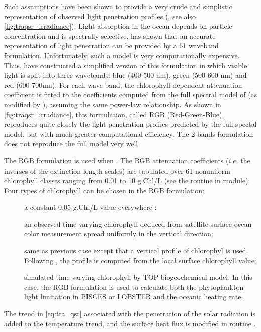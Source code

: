 \documentclass[../main/NEMO_manual]{subfiles}
\begin{document}
Such assumptions have been shown to provide a very crude and simplistic representation of
observed light penetration profiles (\cite{Morel_JGR88}, see also \autoref{fig:traqsr_irradiance}).
Light absorption in the ocean depends on particle concentration and is spectrally selective.
\cite{Morel_JGR88} has shown that an accurate representation of light penetration can be provided by
a 61 waveband formulation.
Unfortunately, such a model is very computationally expensive.
Thus, \cite{Lengaigne_al_CD07} have constructed a simplified version of this formulation in which
visible light is split into three wavebands: blue (400-500 nm), green (500-600 nm) and red (600-700nm).
For each wave-band, the chlorophyll-dependent attenuation coefficient is fitted to the coefficients computed from
the full spectral model of \cite{Morel_JGR88} (as modified by \cite{Morel_Maritorena_JGR01}),
assuming the same power-law relationship.
As shown in \autoref{fig:traqsr_irradiance}, this formulation, called RGB (Red-Green-Blue),
reproduces quite closely the light penetration profiles predicted by the full spectal model,
but with much greater computational efficiency.
The 2-bands formulation does not reproduce the full model very well. 

The RGB formulation is used when .
The RGB attenuation coefficients ($i.e.$ the inverses of the extinction length scales) are tabulated over
61 nonuniform chlorophyll classes ranging from 0.01 to 10 g.Chl/L
(see the routine  in  module).
Four types of chlorophyll can be chosen in the RGB formulation:
\begin{description} 
\item[]
  a constant 0.05 g.Chl/L value everywhere ; 
\item[]
  an observed time varying chlorophyll deduced from satellite surface ocean color measurement spread uniformly in
  the vertical direction;
\item[]
  same as previous case except that a vertical profile of chlorophyl is used.
  Following \cite{Morel_Berthon_LO89}, the profile is computed from the local surface chlorophyll value;
\item[]
  simulated time varying chlorophyll by TOP biogeochemical model.
  In this case, the RGB formulation is used to calculate both the phytoplankton light limitation in
  PISCES or LOBSTER and the oceanic heating rate. 
\end{description} 
The trend in \autoref{eq:tra_qsr} associated with the penetration of the solar radiation is added to
the temperature trend, and the surface heat flux is modified in routine .
\end{document}
